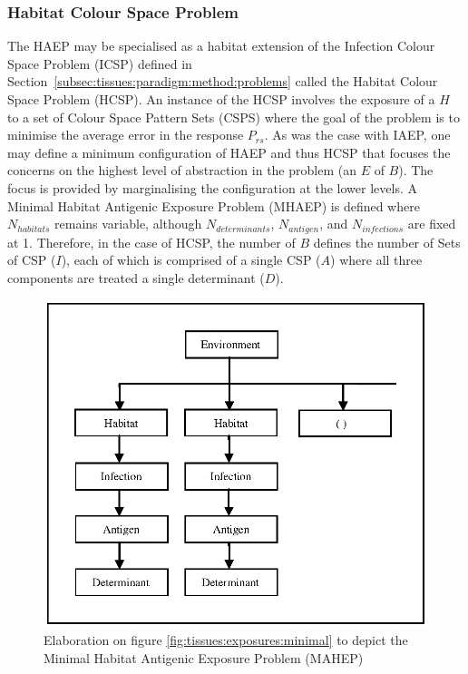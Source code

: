 \subsubsection{Habitat Colour Space Problem}
The HAEP may be specialised as a habitat extension of the Infection Colour Space Problem (ICSP) defined in Section~\ref{subsec:tissues:paradigm:method:problems} called the Habitat Colour Space Problem (HCSP). An instance of the HCSP involves the exposure of a $H$ to a set of Colour Space Pattern Sets (CSPS) where the goal of the problem is to minimise the average error in the response $P_{rs}$. 
As was the case with IAEP, one may define a minimum configuration of HAEP and thus HCSP that focuses the concerns on the highest level of abstraction in the problem (an $E$ of $B$). The focus is provided by marginalising the configuration at the lower levels. A Minimal Habitat Antigenic Exposure Problem (MHAEP) is defined where $N_{habitats}$ remains variable, although $N_{determinants}$, $N_{antigen}$, and $N_{infections}$ are fixed at 1. Therefore, in the case of HCSP, the number of $B$ defines the number of Sets of CSP ($I$), each of which is comprised of a single CSP ($A$) where all three components are treated a single determinant ($D$).

\begin{figure}[htp]
	\centering
		\includegraphics[scale=0.75]{Hosts/hosts-habitats-minimal}
	\caption{Elaboration on figure \ref{fig:tissues:exposures:minimal} to depict the Minimal Habitat Antigenic Exposure Problem (MAHEP)}
	\label{fig:hosts:habitats:minimal}
\end{figure}


